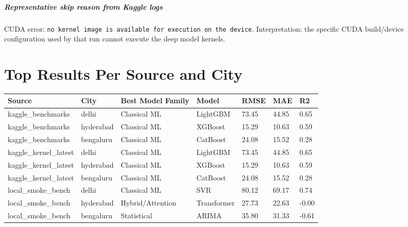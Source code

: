 \documentclass[11pt,a4paper,oneside]{book}
\begin{document}
\paragraph{Representative skip reason from Kaggle logs}
CUDA error: \texttt{no kernel image is available for execution on the device}.  
Interpretation: the specific CUDA build/device configuration used by that run cannot execute the deep model kernels.

\chapter{Top Results Per Source and City}
\footnotesize
\begin{longtable}{@{}L{3.1cm}L{1.5cm}L{2.2cm}L{1.7cm}L{0.9cm}L{0.9cm}L{0.8cm}@{}}
\toprule
Source & City & Best Model Family & Model & RMSE & MAE & R2 \\
\midrule
kaggle\_benchmarks & delhi & Classical ML & LightGBM & 73.45 & 44.85 & 0.65 \\
kaggle\_benchmarks & hyderabad & Classical ML & XGBoost & 15.29 & 10.63 & 0.59 \\
kaggle\_benchmarks & bengaluru & Classical ML & CatBoost & 24.08 & 15.52 & 0.28 \\
kaggle\_kernel\_latest & delhi & Classical ML & LightGBM & 73.45 & 44.85 & 0.65 \\
kaggle\_kernel\_latest & hyderabad & Classical ML & XGBoost & 15.29 & 10.63 & 0.59 \\
kaggle\_kernel\_latest & bengaluru & Classical ML & CatBoost & 24.08 & 15.52 & 0.28 \\
local\_smoke\_bench & delhi & Classical ML & SVR & 80.12 & 69.17 & 0.74 \\
local\_smoke\_bench & hyderabad & Hybrid/Attention & Transformer & 27.73 & 22.63 & -0.00 \\
local\_smoke\_bench & bengaluru & Statistical & ARIMA & 35.80 & 31.33 & -0.61 \\
\bottomrule
\end{longtable}
\normalsize
\end{document}
